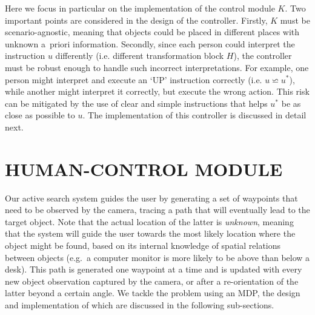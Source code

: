 \documentclass[a4paper, twoside]{article}
\begin{document}
Here we focus in particular on the implementation of the control module $K$. Two important points are considered in the design of the controller. Firstly, $K$ must be scenario-agnostic, meaning that objects could be placed in different places with unknown a~priori information. Secondly, since each person could interpret the instruction $u$ differently (i.e. different transformation block $H$), the controller must be robust enough to handle such incorrect interpretations. For example, one person might interpret and execute an `UP' instruction correctly (i.e. $u \backsimeq u^*$), while another might interpret it correctly, but execute the wrong action. This risk can be mitigated by the use of clear and simple instructions that helps $u^*$ be as close as possible to $u$. The implementation of this controller is discussed in detail next. 

\section{\uppercase{Human-control Module}}\label{sec:controller-design}

\noindent Our active search system guides the user by generating a set of waypoints that need to be observed by the camera, tracing a path that will eventually lead to the target object. Note that the actual location of the latter is {\em unknown}, meaning that the system will guide the user towards the most likely location where the object might be found, based on its internal knowledge of spatial relations between objects (e.g.\ a computer monitor is more likely to be above than below a desk). This path is generated one waypoint at a time and is updated with every new object observation captured by the camera, or after a re-orientation of the latter beyond a certain angle. We tackle the problem using an MDP, the design and implementation of which are discussed in the following sub-sections. %

\end{document}
